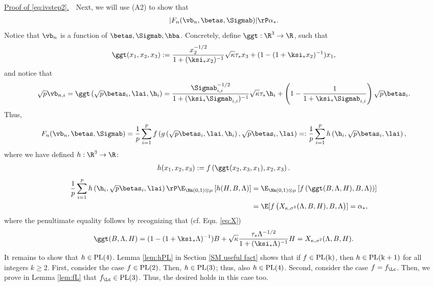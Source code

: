 \vspace{2pt}
\noindent\underline{Proof of \eqref{eq:ivstep2}.}~~Next, we will use (A2) to show that 
\begin{align}
|F_n(\vb_n,\betas,\Sigmab)| \rP \alpha_*.\label{eq:AO_conv}
\end{align}
Notice that $\vb_n$ is a function of $\betas,\Sigmab,\hba$. Concretely, define ${\ggt}:\R^3\rightarrow\R$, such that
$$
\ggt(x_1,x_2,x_3) := \frac{x_2^{-1/2}}{1+(\ksi_* x_2)^{-1}}\sqrt{\kappa}\tau_* x_3 + (1-(1+\ksi_*x_2)^{-1})x_1,
$$
and notice that
$$
\sqrt{p}\vb_{n,i} = \ggt\left(\sqrt{p}\betas_i,\lai,\h_i\right) = \frac{{\Sigmab_{i,i}^{-1/2}}}{1+(\ksi_*\Sigmab_{i,i})^{-1}}\sqrt{\kappa}\tau_*\h_i +\left(1-\frac{1}{1+\ksi_*\Sigmab_{i,i}}\right)\sqrt{p}\betas_i.
$$
Thus,
$$
F_n(\vb_n,\betas,\Sigmab) = \frac{1}{p}\sum_{i=1}^p f\left(g\left(\sqrt{p}\betas_i,\lai,\h_i\right),\sqrt{p}\betas_i,\lai\right) =: \frac{1}{p}\sum_{i=1}^p h\left(\h_i,\sqrt{p}\betas_i,\lai\right),
$$
where we have defined $h:\R^3\rightarrow\R$:
\begin{align}
h(x_1,x_2,x_3) := f\left(\ggt(x_2,x_3,x_1),x_2,x_3\right).\label{h func}
\end{align}
\begin{align}
\frac{1}{p}\sum_{i=1}^p h\left(\h_i,\sqrt{p}\betas_i,\lai\right) \rP \E_{\Nn(0,1)\otimes \mu}\left[h(H,B,\Lambda)\right] &=  \E_{\Nn(0,1)\otimes \mu}\left[f\left(\ggt(B,\Lambda,H),B,\Lambda\right))\right]\\
& = \E[f\left(X_{\kappa,\sigma^2}(\Lambda,B,H),B,\Lambda\right)] = \alpha_*,
\end{align}
where the penultimate equality follows by recognizing that (cf. Eqn. \eqref{eq:X})
$$
\ggt(B,\Lambda,H) = (1-(1+\ksi_*\Lambda)^{-1})B + \sqrt{\kappa}\frac{\tau_*\Lambda^{-1/2}}{1+(\ksi_*\Lambda)^{-1}}H =  X_{\kappa,\sigma^2}(\Lambda,B,H).
$$
It remains to show that $h\in\rm{PL}(4)$. Lemma \ref{lem:hPL} in Section \ref{SM useful fact} shows that if $f\in\rm{PL}(k)$, then $h\in\rm{PL}(k+1)$ for all integers $k\geq 2$.  First, consider the case $f\in\rm{PL}(2)$. Then,  $h\in\rm{PL}(3)$; thus, also $h\in\rm{PL}(4)$. Second, consider the case $f=f_\Lc$. Then, we prove in Lemma \ref{lem:fL}  that $f_\Lc\in\rm{PL}(3)$. Thus, the desired holds in this case too.  

\vspace{5pt}
